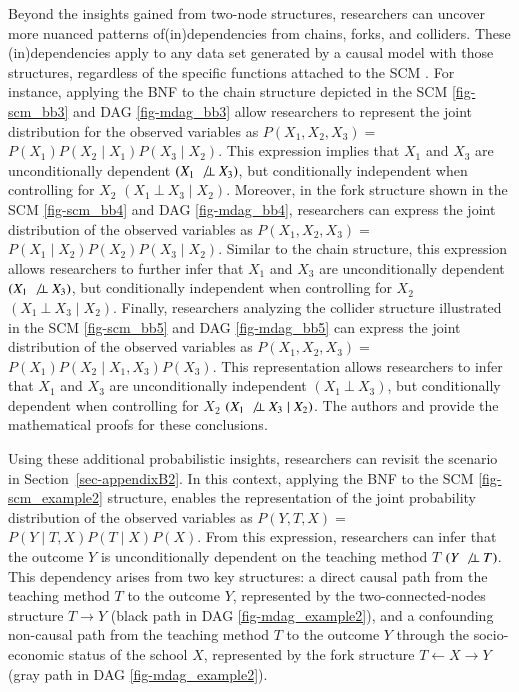 \documentclass[
  authoryear,
  review,
  1p]{elsarticle}
\begin{document}
Beyond the insights gained from two-node structures, researchers can
uncover more nuanced patterns of(in)dependencies from chains, forks, and
colliders. These (in)dependencies apply to any data set generated by a
causal model with those structures, regardless of the specific functions
attached to the SCM \citep[p.~36]{Pearl_et_al_2016}. For instance,
applying the BNF to the chain structure depicted in the SCM
\ref{fig-scm_bb3} and DAG \ref{fig-mdag_bb3} allow researchers to
represent the joint distribution for the observed variables as
\(P(X_{1},X_{2},X_{3}) =\)
\(P(X_{1}) P(X_{2} \mid X_{1}) P(X_{3} \mid X_{2})\). This expression
implies that \(X_{1}\) and \(X_{3}\) are unconditionally dependent
\((X_{1} \:\not\bot\:X_{3})\), but conditionally independent when
controlling for \(X_{2}\) \((X_{1} \:\bot\:X_{3} \mid X_{2})\).
Moreover, in the fork structure shown in the SCM \ref{fig-scm_bb4} and
DAG \ref{fig-mdag_bb4}, researchers can express the joint distribution
of the observed variables as \(P(X_{1},X_{2},X_{3}) =\)
\(P(X_{1} \mid X_{2}) P(X_{2}) P(X_{3} \mid X_{2})\). Similar to the
chain structure, this expression allows researchers to further infer
that \(X_{1}\) and \(X_{3}\) are unconditionally dependent
\((X_{1} \:\not\bot\:X_{3})\), but conditionally independent when
controlling for \(X_{2}\) \((X_{1} \:\bot\:X_{3} \mid X_{2})\). Finally,
researchers analyzing the collider structure illustrated in the SCM
\ref{fig-scm_bb5} and DAG \ref{fig-mdag_bb5} can express the joint
distribution of the observed variables as \(P(X_{1},X_{2},X_{3}) =\)
\(P(X_{1}) P(X_{2} \mid X_{1}, X_{3}) P(X_{3})\). This representation
allows researchers to infer that \(X_{1}\) and \(X_{3}\) are
unconditionally independent \((X_{1} \:\bot\:X_{3})\), but conditionally
dependent when controlling for \(X_{2}\)
\((X_{1} \:\not\bot\:X_{3} \mid X_{2})\). The authors \citet[p.~37, 40,
41]{Pearl_et_al_2016} and \citet[p.~25--26]{Neal_2020} provide the
mathematical proofs for these conclusions.

Using these additional probabilistic insights, researchers can revisit
the scenario in Section~\ref{sec-appendixB2}. In this context, applying
the BNF to the SCM \ref{fig-scm_example2} structure, enables the
representation of the joint probability distribution of the observed
variables as \(P(Y, T, X) =\) \(P(Y \mid T, X) P(T \mid X) P(X)\). From
this expression, researchers can infer that the outcome \(Y\) is
unconditionally dependent on the teaching method \(T\)
\((Y \:\not\bot\:T)\). This dependency arises from two key structures: a
direct causal path from the teaching method \(T\) to the outcome \(Y\),
represented by the two-connected-nodes structure \(T \rightarrow Y\)
(black path in DAG \ref{fig-mdag_example2}), and a confounding
non-causal path from the teaching method \(T\) to the outcome \(Y\)
through the socio-economic status of the school \(X\), represented by
the fork structure \(T \leftarrow X \rightarrow Y\) (gray path in DAG
\ref{fig-mdag_example2}).
\end{document}
